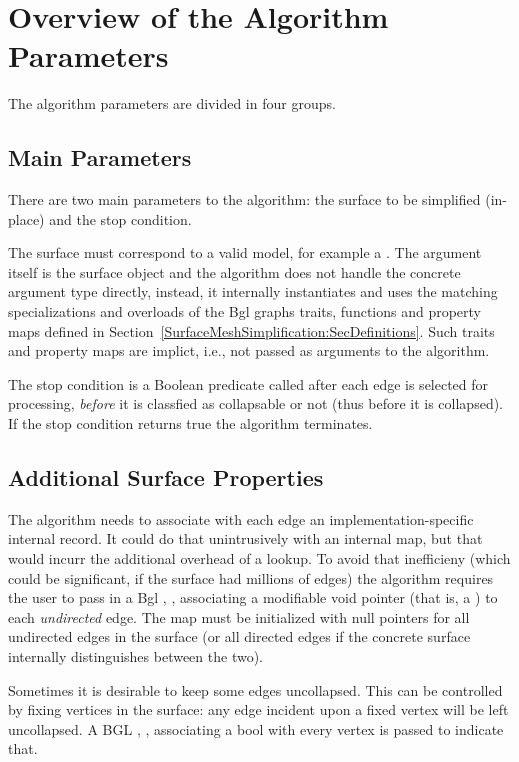 \section{Overview of the Algorithm Parameters}

The algorithm parameters are divided in four groups.

\subsection{Main Parameters}

There are two main parameters to the algorithm: the surface to be simplified (in-place) and the stop condition.

The surface must correspond to a valid  model, for example a . The argument itself is the surface object and the algorithm does not handle the concrete argument type directly, instead, it internally instantiates and uses the matching specializations and overloads of the {\sc Bgl} graphs traits, functions and property maps defined in Section~\ref{SurfaceMeshSimplification:SecDefinitions}. Such traits and property maps are implict, i.e., not passed as arguments to the algorithm.

The stop condition is a Boolean predicate called after each edge is selected for processing, {\em before} it is classfied as collapsable or not (thus before it is collapsed). If the stop condition returns true the algorithm terminates.

\subsection{Additional Surface Properties}

The algorithm needs to associate with each edge an implementation-specific internal record. It could do that unintrusively with an internal map, but that would incurr the additional overhead of a lookup. To avoid that inefficieny (which could be significant, if the surface had millions of edges) the algorithm requires the user to pass in a {\sc Bgl} , , associating a modifiable void pointer (that is, a ) to each {\em undirected} edge. The map must be initialized with null pointers for all undirected edges in the surface (or all directed edges if the concrete surface internally distinguishes between the two). 

Sometimes it is desirable to keep some edges uncollapsed. This can be controlled by fixing vertices in the surface: any edge incident upon a fixed vertex will be left uncollapsed. A {\sc BGL} , , associating a bool with every vertex is passed to indicate that.

